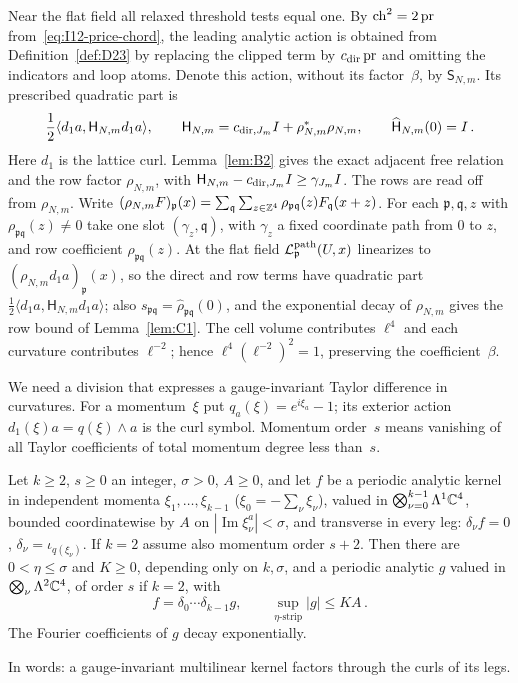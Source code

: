 Near the flat field all relaxed threshold tests equal one. By $\operatorname{ch}^2=2\operatorname{pr}$ from~\eqref{eq:I12-price-chord}, the leading analytic action is obtained from Definition~\ref{def:D23} by replacing the clipped term by $c_{\rm dir}\operatorname{pr}$ and omitting the indicators and loop atoms. Denote this action, without its factor~$\beta$, by $\mathsf S_{N,m}$. Its prescribed quadratic part is
\begin{equation*}
\frac12\langle d_1a,\mathsf H_{N,m}d_1a\rangle,
\qquad \mathsf H_{N,m}=c_{{\rm dir},J_m}I+\rho_{N,m}^*\rho_{N,m},
\qquad \widehat{\mathsf H}_{N,m}(0)=I\,.
\end{equation*}
Here $d_1$ is the lattice curl. Lemma~\ref{lem:B2} gives the exact adjacent free relation and the row factor $\rho_{N,m}$, with $\mathsf H_{N,m}-c_{{\rm dir},J_m}I\ge\gamma_{J_m}I$. The rows are read off from $\rho_{N,m}$. Write $(\rho_{N,m}F)_{\mathfrak p}(x)=\sum_{\mathfrak q}\sum_{z\in\mathbb{Z}^4}\rho_{\mathfrak p\mathfrak q}(z)F_{\mathfrak q}(x+z)$. For each $\mathfrak p,\mathfrak q,z$ with $\rho_{\mathfrak p\mathfrak q}(z)\ne0$ take one slot $(\gamma_z,\mathfrak q)$, with $\gamma_z$ a fixed coordinate path from $0$ to $z$, and row coefficient $\rho_{\mathfrak p\mathfrak q}(z)$. At the flat field $\mathcal L^{\rm path}_{\mathfrak p}(U,x)$ linearizes to $(\rho_{N,m}d_1a)_{\mathfrak p}(x)$, so the direct and row terms have quadratic part $\frac12\langle d_1a,\mathsf H_{N,m}d_1a\rangle$; also $s_{\mathfrak p\mathfrak q}=\widehat\rho_{\mathfrak p\mathfrak q}(0)$, and the exponential decay of $\rho_{N,m}$ gives the row bound of Lemma~\ref{lem:C1}. The cell volume contributes $\ell^4$ and each curvature contributes $\ell^{-2}$; hence $\ell^4(\ell^{-2})^2=1$, preserving the coefficient~$\beta$.

We need a division that expresses a gauge-invariant Taylor difference in curvatures. For a momentum~$\xi$ put $q_a(\xi)=e^{i\xi_a}-1$; its exterior action $d_1(\xi)a=q(\xi)\wedge a$ is the curl symbol. Momentum order~$s$ means vanishing of all Taylor coefficients of total momentum degree less than~$s$.

\begin{lemma}\label{lem:C3}
Let $k\ge2$, $s\ge0$ an integer, $\sigma>0$, $A\ge0$, and let $f$ be a periodic analytic kernel in independent momenta $\xi_1,\ldots,\xi_{k-1}$ ($\xi_0=-\sum_\nu\xi_\nu$), valued in $\bigotimes_{\nu=0}^{k-1}\Lambda^1\mathbb{C}^4$, bounded coordinatewise by $A$ on $|\operatorname{Im}\xi_\nu^a|<\sigma$, and transverse in every leg: $\delta_\nu f=0$, $\delta_\nu=\iota_{q(\xi_\nu)}$. If $k=2$ assume also momentum order $s+2$. Then there are $0<\eta\le\sigma$ and $K\ge0$, depending only on $k,\sigma$, and a periodic analytic $g$ valued in $\bigotimes_\nu\Lambda^2\mathbb{C}^4$, of order $s$ if $k=2$, with
\begin{equation*}
f=\delta_0\cdots\delta_{k-1}g,\qquad \sup_{\eta\text{-strip}}|g|\le KA\,.
\end{equation*}
The Fourier coefficients of $g$ decay exponentially.
\end{lemma}
In words: a gauge-invariant multilinear kernel factors through the curls of its legs.


